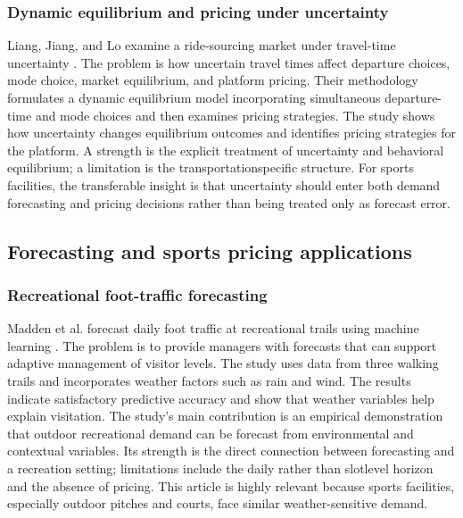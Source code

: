 \subsubsection{Dynamic equilibrium and pricing under uncertainty}
Liang, Jiang, and Lo examine a ride-sourcing market under travel-time uncertainty \cite{r8}. The problem is how uncertain travel times affect departure choices, mode choice, market equilibrium, and platform pricing. Their methodology formulates a dynamic equilibrium model incorporating simultaneous departure-time and mode choices and then examines pricing strategies. The study shows how uncertainty changes equilibrium outcomes and identifies pricing strategies for the platform. A strength is the explicit treatment of uncertainty and behavioral equilibrium; a limitation is the transportationspecific structure. For sports facilities, the transferable insight is that uncertainty should enter both demand forecasting and pricing decisions rather than being treated only as forecast error.

\subsection{Forecasting and sports pricing applications}

\subsubsection{Recreational foot-traffic forecasting}
Madden et al. forecast daily foot traffic at recreational trails using machine learning \cite{r9}. The problem is to provide managers with forecasts that can support adaptive management of visitor levels. The study uses data from three walking trails and incorporates weather factors such as rain and wind. The results indicate satisfactory predictive accuracy and show that weather variables help explain visitation. The study's main contribution is an empirical demonstration that outdoor recreational demand can be forecast from environmental and contextual variables. Its strength is the direct connection between forecasting and a recreation setting; limitations include the daily rather than slotlevel horizon and the absence of pricing. This article is highly relevant because sports facilities, especially outdoor pitches and courts, face similar weather-sensitive demand.

